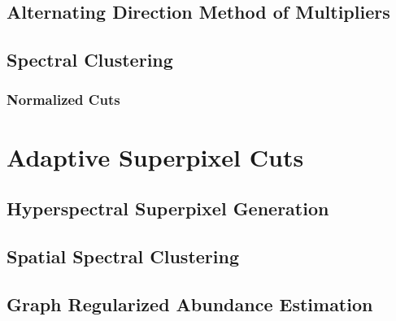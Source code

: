 \documentclass[10pt]{article}
\begin{document}
\subsection{Alternating Direction Method of Multipliers}\label{ADMM Intro}

%  

\subsection{Spectral Clustering} \label{Spectral Clustering}

\subsubsection{Normalized Cuts} \label{Normalized Cuts}


\clearpage
% 
% 
% 
% 
% 
\section{Adaptive Superpixel Cuts} \label{Algorithm Intro}



% 
\subsection{Hyperspectral Superpixel Generation} \label{Algorithm Superpixels}

\subsection{Spatial Spectral Clustering}\label{Algorithm Laplacian}

\subsection{Graph Regularized Abundance Estimation}\label{Algorithm Unmixing}
% 
\end{document}
